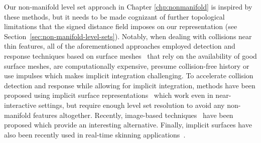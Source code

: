 Our non-manifold level set approach in Chapter \ref{chp:nonmanifold}
is inspired by these methods, but it needs to be made cognizant of
further topological limitations that the signed distance field imposes
on our representation (see
Section~\ref{sec:non-manifold-level-sets}). Notably, when dealing with
collisions near thin features, all of the aforementioned approaches
employed detection and response techniques based on surface
meshes~\citep{BridsFA:2002} that rely on the availability of good
surface meshes, are computationally expensive, presume collision-free
history or use impulses which makes implicit integration
challenging. To accelerate collision detection and response while
allowing for implicit integration, methods have been proposed using
implicit surface representations~\citep{McAdaZSETTS:2011} which work
even in near-interactive settings, but require enough level set
resolution to avoid any non-manifold features altogether. Recently,
image-based techniques~\citep{FaureBAF:2008,WangFP:2012} have been
proposed which provide an interesting alternative.  Finally, implicit
surfaces have also been recently used in real-time skinning
applications~\citep{VaillBGCRWGP:2013,VaillGBWC:2014}.


